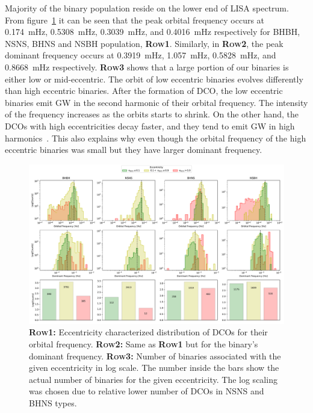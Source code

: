 \documentclass[twocolumn, twocolappendix]{aastex63}
\begin{document}
    Majority of the binary population reside on the lower end of LISA spectrum.
    From figure~\ref{fig:dcofdomeccdetails} it can be seen that the peak orbital frequency occurs at \SI{0.174}{\milli\hertz}, \SI{0.5308}{\milli\hertz}, \SI{0.3039}{\milli\hertz}, and \SI{0.4016}{\milli\hertz} respectively for BHBH, NSNS, BHNS and NSBH population, \textsc{\textbf{Row1}}.
    Similarly, in \textsc{\textbf{Row2}}, the peak dominant frequency occurs at \SI{0.3919}{\milli\hertz}, \SI{1.057}{\milli\hertz}, \SI{0.5828}{\milli\hertz}, and \SI{0.8668}{\milli\hertz} respectively.
    \textsc{\textbf{Row3}} shows that a large portion of our binaries is either low or mid-eccentric.
    The orbit of low eccentric binaries evolves differently than high eccentric binaries.
    After the formation of DCO, the low eccentric binaries emit GW in the second harmonic of their orbital frequency.
    The intensity of the frequency increases as the orbits starts to shrink.
    On the other hand, the DCOs with high eccentricities decay faster, and they tend to emit GW in high harmonics~\citep{Peters1963, Peters1964}.
    This also explains why even though the orbital frequency of the high eccentric binaries was small but they have larger dominant frequency.

    \begin{figure}[!h]%
        \centering
        \includegraphics[width=\columnwidth]{analysis_data/004__images_for_latex/dco_fdom_ecc_details}
        \caption{\textsc{\textbf{Row1:}} Eccentricity characterized distribution of DCOs for their orbital frequency. \textsc{\textbf{Row2:}} Same as \textsc{\textbf{Row1}} but for the binary's dominant frequency. \textsc{\textbf{Row3:}} Number of binaries associated with the given eccentricity in log scale. The number inside the bars show the actual number of binaries for the given eccentricity. The log scaling was chosen due to relative lower number of DCOs in NSNS and BHNS types.}
        \label{fig:dcofdomeccdetails}
    \end{figure}%
\end{document}
